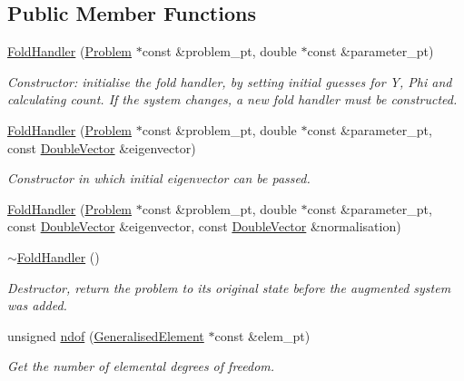 \subsection*{Public Member Functions}
\begin{DoxyCompactItemize}
\item 
\hyperlink{classoomph_1_1FoldHandler_add39896d007559f4fb801f1c95e4ab16}{Fold\+Handler} (\hyperlink{classoomph_1_1Problem}{Problem} $\ast$const \&problem\+\_\+pt, double $\ast$const \&parameter\+\_\+pt)
\begin{DoxyCompactList}\small\item\em Constructor\+: initialise the fold handler, by setting initial guesses for Y, Phi and calculating count. If the system changes, a new fold handler must be constructed. \end{DoxyCompactList}\item 
\hyperlink{classoomph_1_1FoldHandler_ac50106424b3fa4e3346231ec41b7a89f}{Fold\+Handler} (\hyperlink{classoomph_1_1Problem}{Problem} $\ast$const \&problem\+\_\+pt, double $\ast$const \&parameter\+\_\+pt, const \hyperlink{classoomph_1_1DoubleVector}{Double\+Vector} \&eigenvector)
\begin{DoxyCompactList}\small\item\em Constructor in which initial eigenvector can be passed. \end{DoxyCompactList}\item 
\hyperlink{classoomph_1_1FoldHandler_a0e39e588b48269e4f7272b78fa4b99a7}{Fold\+Handler} (\hyperlink{classoomph_1_1Problem}{Problem} $\ast$const \&problem\+\_\+pt, double $\ast$const \&parameter\+\_\+pt, const \hyperlink{classoomph_1_1DoubleVector}{Double\+Vector} \&eigenvector, const \hyperlink{classoomph_1_1DoubleVector}{Double\+Vector} \&normalisation)
\item 
\hyperlink{classoomph_1_1FoldHandler_ab582d9ac969e0f7779a285d21a6d8e45}{$\sim$\+Fold\+Handler} ()
\begin{DoxyCompactList}\small\item\em Destructor, return the problem to its original state before the augmented system was added. \end{DoxyCompactList}\item 
unsigned \hyperlink{classoomph_1_1FoldHandler_af8e766d1faa7867a0161329566865867}{ndof} (\hyperlink{classoomph_1_1GeneralisedElement}{Generalised\+Element} $\ast$const \&elem\+\_\+pt)
\begin{DoxyCompactList}\small\item\em Get the number of elemental degrees of freedom. \end{DoxyCompactList}\item 

\end{DoxyCompactItemize}
